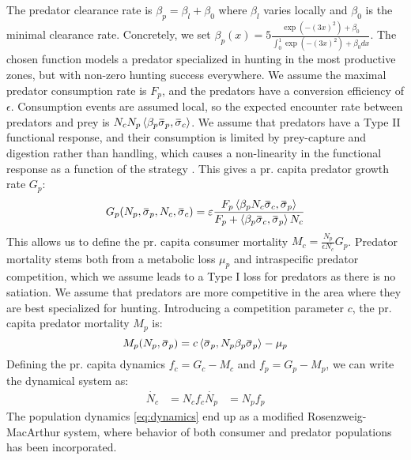 The predator clearance rate is $\beta_p = \beta_{l} + \beta_0$ where $\beta_l$ varies locally and $\beta_0$ is the minimal clearance rate. Concretely, we set $\beta_p(x) = 5 \frac{\exp(-(3 x)^2) + \beta_0}{\int_0^1 \exp(-(3 x)^2) + \beta_0 dx}$. The chosen function models a predator specialized in hunting in the most productive zones, but with non-zero hunting success everywhere. We assume the maximal predator consumption rate is $F_p$, and the predators have a conversion efficiency of $\epsilon$. Consumption events are assumed local, so the expected encounter rate between predators and prey is $N_c N_p \ip{\beta_p \overbar{\sigma}_p}{\overbar{\sigma}_c}$. We assume that predators have a Type II functional response, and their consumption is limited by prey-capture and digestion rather than handling, which causes a non-linearity in the functional response as a function of the strategy \citep{Kioerboe2018}. This gives a pr. capita predator growth rate $G_p$:
\begin{equation}
  G_p(N_p, \overbar{\sigma}_p, N_c, \overbar{\sigma}_c )= \epsilon\frac{F_p \ip{\beta_p N_c\overbar{\sigma}_c}{\overbar{\sigma}_p} }{F_p + \ip{\beta_p \overbar{\sigma}_c}{\overbar{\sigma}_p} N_c}
\end{equation}
This allows us to define the pr. capita consumer mortality $M_c = \frac{N_p}{\epsilon N_c}G_p$. Predator mortality stems both from a metabolic loss $\mu_p$ and intraspecific predator competition, which we assume leads to a Type I loss for predators as there is no satiation. We assume that predators are more competitive in the area where they are best specialized for hunting. Introducing a competition parameter $c$, the pr. capita predator mortality $M_p$ is:
\begin{equation}
  M_p(N_p, \overbar{\sigma}_p) =  c \ip{\overbar{\sigma}_p}{N_p\beta_p \overbar{\sigma}_p}  - \mu_p
\end{equation}
Defining the pr. capita dynamics $f_c = G_c - M_c$ and $f_p = G_p - M_p$, we can write the dynamical system as:
\begin{align}
  \dot{N_c} &= N_c f_c
  \dot{N_p} &= N_p f_p
  \label{eq:dynamics}
\end{align}
The population dynamics \ref{eq:dynamics} end up as a modified Rosenzweig-MacArthur system, where behavior of both consumer and predator populations has been incorporated.
